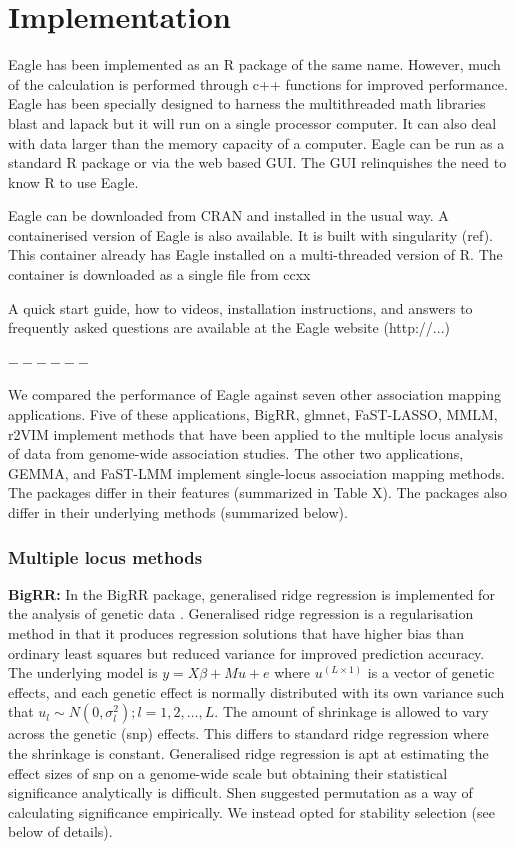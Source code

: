 \documentclass{nature}
\begin{document}
\section{Implementation}

Eagle has been implemented as an R package of the same name. However, much of the calculation is performed through c++ functions for improved performance. Eagle has been specially designed to harness the multithreaded math libraries blast and lapack but it will run on a single processor computer. It can also deal with data larger than the memory capacity of a computer. Eagle can be run as a standard R package or via the web based GUI. The GUI relinquishes the need to know R to use Eagle.


Eagle can be downloaded from CRAN and installed in the usual way. A containerised version of Eagle is also available. It is built with singularity (ref). This container already has Eagle installed on a multi-threaded version of R. The container is downloaded as a single file from ccxx


A quick start guide, how to videos, installation instructions, and answers to frequently asked questions are available at the Eagle website (http://...)



$------$




We compared the performance of Eagle against seven other association mapping applications. 
Five of these applications, BigRR, glmnet, FaST-LASSO, MMLM, r2VIM implement methods that have been applied to the multiple locus analysis of data from genome-wide association studies. 
The other two applications, GEMMA, and FaST-LMM implement single-locus association mapping methods. 
The packages 
differ in their features (summarized in Table X).  The packages also differ in their underlying methods (summarized below). 

\subsubsection{Multiple locus methods}

\textbf{BigRR:}  In the BigRR package,  generalised ridge regression is implemented  for
the analysis of genetic data \cite{shen2013novel}.  Generalised ridge regression 
 is a regularisation method in that it produces regression solutions 
that have higher bias than ordinary least squares but reduced variance for improved prediction accuracy. The underlying 
model is  $y = X \beta + M u + e$ where $u^{(L \times 1)}$ is a vector of genetic effects, and each genetic 
effect is normally distributed with its own variance such that $u_l \sim N(0, \sigma^2_l); l=1,2, \ldots, L$.  The 
amount of shrinkage is allowed to vary across the genetic (snp) effects. This differs to 
standard ridge regression where the shrinkage is constant. 
Generalised ridge regression is apt at estimating the effect sizes of snp on a genome-wide scale but  obtaining their 
statistical significance analytically is difficult. Shen \cite{shen2013novel} suggested permutation as a way of calculating significance 
empirically. We instead opted for stability selection (see below of details). 
\end{document}
